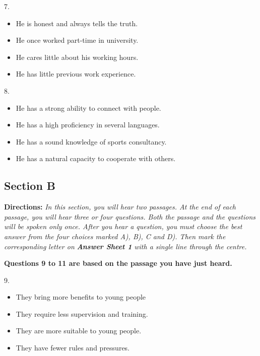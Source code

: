 \documentclass[UTF8,11pt]{ctexart}
\begin{document}
7.


\begin{itemize}[leftmargin=2em,itemsep=.2em,topsep=.4em]\item[A.] He is honest and always tells the truth.
\item[B.] He once worked part-time in university.
\item[C.] He cares little about his working hours.
\item[D.] He has little previous work experience.
\end{itemize}

8.


\begin{itemize}[leftmargin=2em,itemsep=.2em,topsep=.4em]\item[A.] He has a strong ability to connect with people.
\item[B.] He has a high proficiency in several languages.
\item[C.] He has a sound knowledge of sports consultancy.
\item[D.] He has a natural capacity to cooperate with others.
\end{itemize}

\subsection*{\textbf{Section B}}


\textbf{Directions:} \textit{In this section, you will hear two passages. At the end of each passage, you will hear three or} \textit{four questions. Both the passage and the questions will be spoken only once. After you hear a question, you} \textit{must choose the best answer from the four choices marked A), B), C and D). Then mark the corresponding} \textit{letter on }\textbf{\textit{Answer Sheet 1}}\textit{ with a single line through the centre.}


\textbf{Questions 9 to 11 are based on the passage you have just heard.}


9.


\begin{itemize}[leftmargin=2em,itemsep=.2em,topsep=.4em]\item[A.] They bring more benefits to young people
\item[B.] They require less supervision and training.
\item[C.] They are more suitable to young people.
\item[D.] They have fewer rules and pressures.
\end{itemize}
\end{document}
